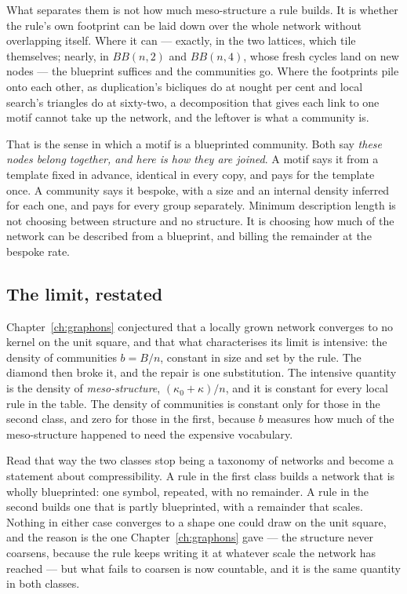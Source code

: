 What separates them is not how much meso-structure a rule builds. It is whether
the rule's own footprint can be laid down over the whole network without
overlapping itself. Where it can --- exactly, in the two lattices, which tile
themselves; nearly, in $BB(n,2)$ and $BB(n,4)$, whose fresh cycles land on new
nodes --- the blueprint suffices and the communities go. Where the footprints
pile onto each other, as duplication's bicliques do at nought per cent and local
search's triangles do at sixty-two, a decomposition that gives each link to one
motif cannot take up the network, and the leftover is what a community is.

That is the sense in which a motif is a blueprinted community. Both say
\emph{these nodes belong together, and here is how they are joined}. A motif says
it from a template fixed in advance, identical in every copy, and pays for the
template once. A community says it bespoke, with a size and an internal density
inferred for each one, and pays for every group separately. Minimum description
length is not choosing between structure and no structure. It is choosing how
much of the network can be described from a blueprint, and billing the remainder
at the bespoke rate.

\subsection*{The limit, restated}

Chapter~\ref{ch:graphons} conjectured that a locally grown network converges to
no kernel on the unit square, and that what characterises its limit is intensive:
the density of communities $b=B/n$, constant in size and set by the rule. The
diamond then broke it, and the repair is one substitution. The intensive quantity
is the density of \emph{meso-structure}, $(\kappa_0+\kappa)/n$, and it is
constant for every local rule in the table. The density of communities is
constant only for those in the second class, and zero for those in the first,
because $b$ measures how much of the meso-structure happened to need the
expensive vocabulary.

Read that way the two classes stop being a taxonomy of networks and become a
statement about compressibility. A rule in the first class builds a network that
is wholly blueprinted: one symbol, repeated, with no remainder. A rule in the
second builds one that is partly blueprinted, with a remainder that scales.
Nothing in either case converges to a shape one could draw on the unit square,
and the reason is the one Chapter~\ref{ch:graphons} gave --- the structure never
coarsens, because the rule keeps writing it at whatever scale the network has
reached --- but what fails to coarsen is now countable, and it is the same
quantity in both classes.

